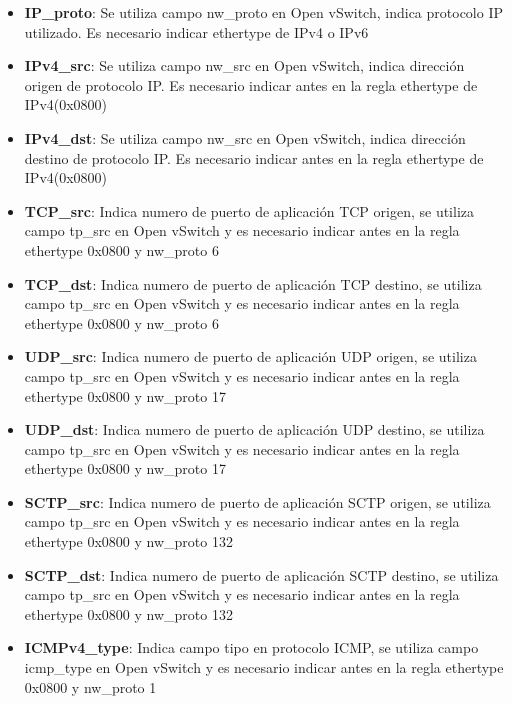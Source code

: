 \begin{itemize}
\item \textbf{IP\_proto}: Se utiliza campo nw\_proto en Open vSwitch, indica protocolo IP utilizado. Es necesario indicar ethertype de IPv4 o IPv6

\item \textbf{IPv4\_src}: Se utiliza campo nw\_src en Open vSwitch, indica direcci\'on origen de protocolo IP. Es necesario indicar antes en la regla ethertype de IPv4(0x0800)

\item \textbf{IPv4\_dst}: Se utiliza campo nw\_src en Open vSwitch, indica direcci\'on destino de protocolo IP. Es necesario indicar antes en la regla ethertype de IPv4(0x0800)

\item \textbf{TCP\_src}: Indica numero de puerto de aplicaci\'on TCP origen, se utiliza campo tp\_src en Open vSwitch y es necesario indicar antes en la regla ethertype 0x0800 y nw\_proto 6

\item \textbf{TCP\_dst}: Indica numero de puerto de aplicaci\'on TCP destino, se utiliza campo tp\_src en Open vSwitch y es necesario indicar antes en la regla ethertype 0x0800 y nw\_proto 6

\item \textbf{UDP\_src}: Indica numero de puerto de aplicaci\'on UDP origen, se utiliza campo tp\_src en Open vSwitch y es necesario indicar antes en la regla ethertype 0x0800 y nw\_proto 17

\item \textbf{UDP\_dst}: Indica numero de puerto de aplicaci\'on UDP destino, se utiliza campo tp\_src en Open vSwitch y es necesario indicar antes en la regla ethertype 0x0800 y nw\_proto 17

\item \textbf{SCTP\_src}: Indica numero de puerto de aplicaci\'on SCTP origen, se utiliza campo tp\_src en Open vSwitch y es necesario indicar antes en la regla ethertype 0x0800 y nw\_proto 132

\item \textbf{SCTP\_dst}: Indica numero de puerto de aplicaci\'on SCTP destino, se utiliza campo tp\_src en Open vSwitch y es necesario indicar antes en la regla ethertype 0x0800 y nw\_proto 132

\item \textbf{ICMPv4\_type}: Indica campo tipo en protocolo ICMP, se utiliza campo icmp\_type en Open vSwitch y es necesario indicar antes en la regla ethertype 0x0800 y nw\_proto 1


\end{itemize}
